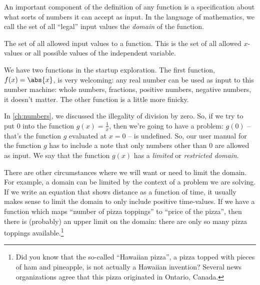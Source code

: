 An important component of the definition of any function is a specification about what sorts of numbers it can accept as input. In the language of mathematics, we call the set of all ``legal'' input values the \textit{domain} of the function.

\begin{boxdef}[Domain]
The set of all allowed input values to a function. This is the set of all allowed $x$-values or all possible values of the independent variable.
\end{boxdef}

We have two functions in the startup exploration. The first function, $f(x)=\abs{x}$, is very welcoming: any real number can be used as input to this number machine: whole numbers, fractions, positive numbers, negative numbers, it doesn't matter. The other function is a little more finicky.

In \cref{ch:numbers}, we discussed the illegality of division by zero. So, if we try to put 0 into the function $g(x)=\frac{1}{x}$, then we're going to have a problem: $g(0)$ -- that's the function $g$ evaluated at $x=0$ -- is undefined. So, our user manual for the function $g$ has to include a note that only numbers other than 0 are allowed as input. We say that the function $g(x)$ has a \textit{limited} or \textit{restricted domain}.


There are other circumstances where we will want or need to limit the domain. For example, a domain can be limited by the context of a problem we are solving. If we write an equation that shows distance as a function of time, it usually makes sense to limit the domain to only include positive time-values. If we have a function which maps ``number of pizza toppings'' to ``price of the pizza'', then there is (probably) an upper limit on the domain: there are only so many pizza toppings available.\footnote{Did you know that the so-called ``Hawaiian pizza'', a pizza topped with pieces of ham and pineapple, is not actually a Hawaiian invention? Several news organizations agree that this pizza originated in Ontario, Canada.}

